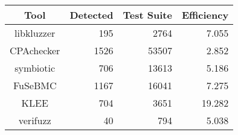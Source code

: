 \begin{table}
	\begin{center}
		\begin{tabular}{|c|r|r|r|}
			\hline
			Tool & Detected & Test Suite & Efficiency \\
			\hline
			libkluzzer & 195 & 2764 & 7.055 \\
			\hline
			CPAchecker & 1526 & 53507 & 2.852 \\
			\hline
			symbiotic & 706 & 13613 & 5.186 \\
			\hline
			FuSeBMC & 1167 & 16041 & 7.275 \\
			\hline
			KLEE & 704 & 3651 & 19.282 \\
			\hline
			verifuzz & 40 & 794 & 5.038 \\
			\hline
		\end{tabular}
	\end{center}
\end{table}